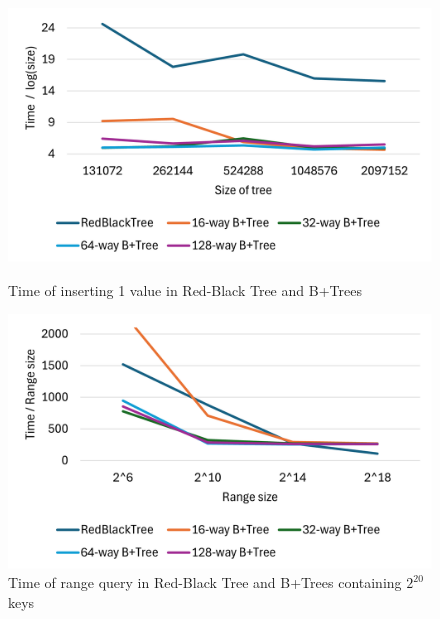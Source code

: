 \documentclass[11pt]{report}
\theoremstyle{definition}
\begin{document}
\newpage
{}
\begin{figure}[htbp]
  \centering
  \begin{minipage}[b]{0.49\textwidth}
    \centering
    \includegraphics[width=\textwidth]{asset/insert.png}
    \captionsetup{width=0.9\textwidth}
    \caption{Time of inserting 1 value in Red-Black Tree and B+Trees}
    \label{fig:insert_BPlusTree}
  \end{minipage}
  \begin{minipage}[b]{0.49\textwidth}
    \centering
    \includegraphics[width=\textwidth]{asset/range_query.png}
    \captionsetup{width=0.9\textwidth}
    \caption{Time of range query in Red-Black Tree and B+Trees containing $2^{20}$ keys}
    \label{fig:rq_BPlusTree}
  \end{minipage}

  \vspace{0.5cm}


\end{figure}
\end{document}
